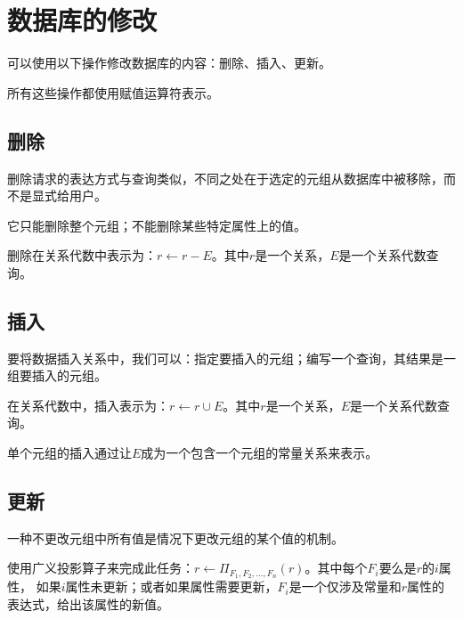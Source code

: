 \section{数据库的修改}

可以使用以下操作修改数据库的内容：删除、插入、更新。

所有这些操作都使用赋值运算符表示。

\subsection{删除}

删除请求的表达方式与查询类似，不同之处在于选定的元组从数据库中被移除，而不是显式给用户。

它只能删除整个元组；不能删除某些特定属性上的值。

删除在关系代数中表示为：$r\gets r-E$。其中$r$是一个关系，$E$是一个关系代数查询。

\subsection{插入}

要将数据插入关系中，我们可以：指定要插入的元组；编写一个查询，其结果是一组要插入的元组。

在关系代数中，插入表示为：$r\gets r\cup E$。其中$r$是一个关系，$E$是一个关系代数查询。

单个元组的插入通过让$E$成为一个包含一个元组的常量关系来表示。

\subsection{更新}

一种不更改元组中所有值是情况下更改元组的某个值的机制。

使用广义投影算子来完成此任务：$r\gets \Pi_{F_1,F_2,...,F_n}(r)$。其中每个$F_i$要么是$r$的$i$属性，
如果$i$属性未更新；或者如果属性需要更新，$F_i$是一个仅涉及常量和$r$属性的表达式，给出该属性的新值。